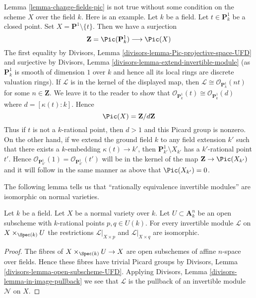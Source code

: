 \begin{example}
\label{example-need-condition}
Lemma \ref{lemma-change-fields-pic} is not true without some condition
on the scheme $X$ over the field $k$. Here is an example.
Let $k$ be a field. Let $t \in \mathbf{P}^1_k$ be a closed point.
Set $X = \mathbf{P}^1 \setminus \{t\}$. Then we have a surjection
$$
\mathbf{Z} = \Pic(\mathbf{P}^1_k) \longrightarrow \Pic(X)
$$
The first equality by
Divisors, Lemma \ref{divisors-lemma-Pic-projective-space-UFD}
and surjective by
Divisors, Lemma \ref{divisors-lemma-extend-invertible-module}
(as $\mathbf{P}^1_k$ is smooth of dimension $1$ over $k$ and
hence all its local rings are discrete valuation rings).
If $\mathcal{L}$ is in the kernel of the displayed map,
then $\mathcal{L} \cong \mathcal{O}_{\mathbf{P}^1_k}(nt)$
for some $n \in \mathbf{Z}$. We leave it to the reader
to show that
$\mathcal{O}_{\mathbf{P}^1_k}(t) \cong \mathcal{O}_{\mathbf{P}^1_k}(d)$
where $d = [\kappa(t) : k]$. Hence
$$
\Pic(X) = \mathbf{Z}/d\mathbf{Z}
$$
Thus if $t$ is not a $k$-rational point, then $d > 1$ and this
Picard group is nonzero.
On the other hand, if we extend the ground field $k$ to any field
extension $k'$ such that there exists a $k$-embedding
$\kappa(t) \to k'$, then $\mathbf{P}^1_{k'} \setminus X_{k'}$
has a $k'$-rational point $t'$. Hence
$\mathcal{O}_{\mathbf{P}^1_{k'}}(1) = \mathcal{O}_{\mathbf{P}^1_{k'}}(t')$
will be in the kernel of the map $\mathbf{Z} \to \Pic(X_{k'})$
and it will follow in the same manner as above that
$\Pic(X_{k'}) = 0$.
\end{example}

\noindent
The following lemma tells us that ``rationally
equivalence invertible modules'' are isomorphic on normal varieties.

\begin{lemma}
\label{lemma-rational-equivalence-for-Pic}
Let $k$ be a field. Let $X$ be a normal variety over $k$.
Let $U \subset \mathbf{A}^n_k$ be an open subscheme with
$k$-rational points $p, q \in U(k)$. For every invertible
module $\mathcal{L}$ on $X \times_{\Spec(k)} U$ the restrictions
$\mathcal{L}|_{X \times p}$ and $\mathcal{L}|_{X \times q}$
are isomorphic.
\end{lemma}

\begin{proof}
The fibres of $X \times_{\Spec(k)} U \to X$ are open subschemes
of affine $n$-space over fields. Hence these fibres have
trivial Picard groups by
Divisors, Lemma \ref{divisors-lemma-open-subscheme-UFD}.
Applying Divisors, Lemma \ref{divisors-lemma-in-image-pullback}
we see that $\mathcal{L}$ is the pullback of an invertible
module $\mathcal{N}$ on $X$.
\end{proof}










